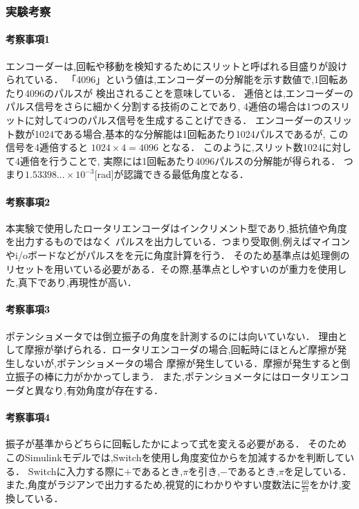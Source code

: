\subsubsection{実験考察}
\paragraph{考察事項1}
エンコーダーは,回転や移動を検知するためにスリットと呼ばれる目盛りが設けられている．
「4096」という値は,エンコーダーの分解能を示す数値で,1回転あたり4096のパルスが
検出されることを意味している．
逓倍とは,エンコーダーのパルス信号をさらに細かく分割する技術のことであり,
4逓倍の場合は1つのスリットに対して4つのパルス信号を生成することげできる．
エンコーダーのスリット数が1024である場合,基本的な分解能は1回転あたり1024パルスであるが,
この信号を4逓倍すると
\( 1024\times 4=4096 \) となる．
このように,スリット数1024に対して4逓倍を行うことで,
実際には1回転あたり4096パルスの分解能が得られる．
つまり\( 1.53398...\times10^{-3} \)[rad]が認識できる最低角度となる．

\paragraph{考察事項2}
本実験で使用したロータリエンコーダはインクリメント型であり,抵抗値や角度を出力するものではなく
パルスを出力している．つまり受取側,例えばマイコンやi/oボードなどがパルスをを元に角度計算を行う．
そのため基準点は処理側のリセットを用いている必要がある．その際,基準点としやすいのが重力を使用した,真下であり,再現性が高い．

\paragraph{考察事項3}
ポテンショメータでは倒立振子の角度を計測するのには向いていない．
理由として摩擦が挙げられる．ロータリエンコーダの場合,回転時にほとんど摩擦が発生しないが,ポテンショメータの場合
摩擦が発生している．摩擦が発生すると倒立振子の棒に力がかかってしまう．
また,ポテンショメータにはロータリエンコーダと異なり,有効角度が存在する．

\paragraph{考察事項4}
振子が基準からどちらに回転したかによって式を変える必要がある．
そのためこのSimulinkモデルでは,Switchを使用し角度変位からを加減するかを判断している．
Switchに入力する際に\( + \)であるとき,\( \pi \)を引き,\( - \)であるとき,\( \pi \)を足している．
また,角度がラジアンで出力するため,視覚的にわかりやすい度数法に\( \frac{60}{2\pi}\)をかけ,変換している．

